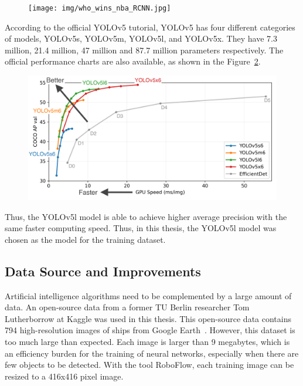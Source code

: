 \begin{figure}[p]
    \centering
    \texttt{[image: img/who\_wins\_nba\_RCNN.jpg]}
    \label{fig:who_wins_nba_RCNN}
\end{figure}


According to the official YOLOv5 tutorial, YOLOv5 has four different categories of models, YOLOv5s, YOLOv5m, YOLOv5l, and YOLOv5x. They have 7.3 million, 21.4 million, 47 million and 87.7 million parameters respectively. The official performance charts are also available, as shown in the Figure~\ref{fig:YOLOv5_Performance}.\\

\begin{figure}[h]
    \centering
    \includegraphics[scale=0.7]{img/YOLOv5_Performance.png}
    \label{fig:YOLOv5_Performance}
\end{figure}

Thus, the YOLOv5l model is able to achieve higher average precision with the same faster computing speed. Thus, in this thesis, the YOLOv5l model was chosen as the model for the training dataset.\\



\newpage
\subsection{Data Source and Improvements}
Artificial intelligence algorithms need to be complemented by a large amount of data. An open-source data from a former TU Berlin researcher Tom Lutherborrow at Kaggle was used in this thesis. This open-source data contains 794 high-resolution images of ships from Google Earth~\cite{lutherborrowship}. However, this dataset is too much large than expected. Each image is larger than 9 megabytes, which is an efficiency burden for the training of neural networks, especially when there are few objects to be detected. With the tool RoboFlow, each training image can be resized to a 416x416 pixel image.\\


